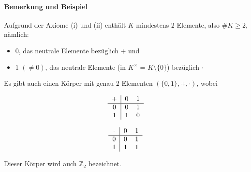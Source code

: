 \paragraph{Bemerkung und Beispiel}
	Aufgrund der Axiome (i) und (ii) enthält $ K $ mindestens 2 Elemente, also $ \# K \geq 2 $, nämlich:
	\begin{itemize}
		\item $ 0 $, das neutrale Elemente bezüglich $+$ und
		\item $1$ $(\neq 0)$, das neutrale Elemente (in $K^\times$ = $K\setminus\{0\}$) bezüglich $\cdot$
	\end{itemize}
	Es gibt auch einen Körper mit genau 2 Elementen $(\{0,1\},+,\cdot)$, wobei
	
	\begin{minipage}{0.45\textwidth}
		\begin{equation*}
			\begin{tabular}{c|cc}
				$+$ & 0 & 1\\\hline
				0 & 0 & 1\\
				1 & 1 & 0\\
			\end{tabular}
		\end{equation*}
	\end{minipage}
	\begin{minipage}{0.45\textwidth}
		\begin{equation*}
			\begin{tabular}{c|cc}
				$\cdot$ & 0 & 1\\\hline
				0 & 0 & 1\\
				1 & 1 & 1\\
			\end{tabular}
		\end{equation*}
	\end{minipage}
	
	Dieser Körper wird auch $\mathbb{Z}_2$ bezeichnet.

